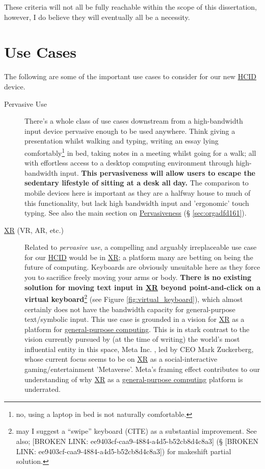 \documentclass[logo,bsc,singlespacing,parskip]{infthesis}
\begin{document}
These criteria will not all be fully reachable within the scope of this dissertation, however, I do believe they will eventually all be a necessity.

\chapter{Use Cases}
\label{sec:orgda9cb59}
The following are some of the important use cases to consider for our new \hyperref[orgf95a76e]{HCID} device.

\begin{description}
\item[{Pervasive Use}] There's a whole class of use cases downstream from a high-bandwidth input device pervasive enough to be used anywhere.
Think giving a presentation whilst walking and typing, writing an essay lying comfortably\footnote{no, using a laptop in bed is not naturally comfortable.} in bed, taking notes in a meeting whilst going for a walk; all with effortless access to a desktop computing environment through high-bandwidth input.
\textbf{This pervasiveness will allow users to escape the sedentary lifestyle of sitting at a desk all day.}
The comparison to mobile devices here is important as they are a halfway house to much of this functionality, but lack high bandwidth input and 'ergonomic' touch typing.
See also the main section on \hyperref[sec:orgadfd161]{Pervasiveness} (§ \ref{sec:orgadfd161}).

\item[{\hyperref[org88b0f70]{XR} (VR, AR, etc.)}] Related to \emph{pervasive use}, a compelling and arguably irreplaceable use case for our \hyperref[orgf95a76e]{HCID} would be in \hyperref[org88b0f70]{XR}; a platform many are betting on being the future of computing.
Keyboards are obviously unsuitable here as they force you to sacrifice freely moving your arms or body.
\textbf{There is no existing solution for moving text input in \hyperref[org88b0f70]{XR} beyond point-and-click on a virtual keyboard}\footnote{may I suggest a ``swipe'' keyboard (CITE) as a substantial improvement. See also; [BROKEN LINK: ee9403cf-caa9-4884-a4d5-b52cb8d4c8a3] (§ [BROKEN LINK: ee9403cf-caa9-4884-a4d5-b52cb8d4c8a3]) for makeshift partial solution.} (see Figure \ref{fig:virtual_keyboard}), which almost certainly does not have the bandwidth capacity for general-purpose text/symbolic input.
This use case is grounded in a vision for \hyperref[org88b0f70]{XR} as a platform for \hyperref[orgc53ce01]{general-purpose computing}.
This is in stark contrast to the vision currently pursued by (at the time of writing) the world's most influential entity in this space, Meta Inc. \autocite{WelcomeMetaMeta}, led by CEO Mark Zuckerberg, whose current focus seems to be on \hyperref[org88b0f70]{XR} as a social-interactive gaming/entertainment 'Metaverse'.
Meta's framing effect contributes to our understanding of why \hyperref[org88b0f70]{XR} as a \hyperref[orgc53ce01]{general-purpose computing} platform is underrated.


\end{description}
\end{document}

